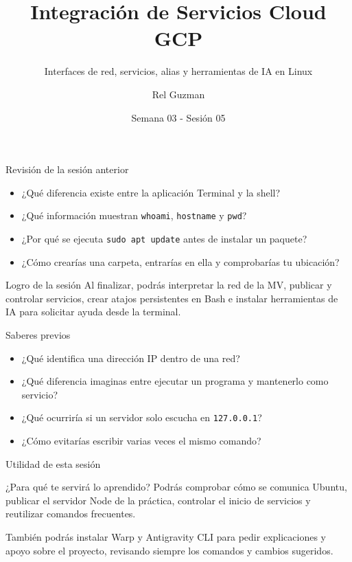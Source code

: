 \documentclass[aspectratio=169,10pt,c]{beamer}
\title{Integración de Servicios Cloud GCP}
\subtitle{Interfaces de red, servicios, alias y herramientas de IA en Linux}
\date{Semana 03 - Sesión 05}
\author{Rel Guzman}
\begin{document}
{\maketitle}

\begin{frame}{Revisión de la sesión anterior}
\begin{itemize}\setlength\itemsep{10pt}
  \item ¿Qué diferencia existe entre la aplicación Terminal y la shell?
  \item ¿Qué información muestran \texttt{whoami}, \texttt{hostname} y \texttt{pwd}?
  \item ¿Por qué se ejecuta \texttt{sudo apt update} antes de instalar un paquete?
  \item ¿Cómo crearías una carpeta, entrarías en ella y comprobarías tu ubicación?
\end{itemize}
\end{frame}

\begin{frame}[c]
\begin{block}{Logro de la sesión}
Al finalizar, podrás interpretar la red de la MV, publicar y controlar servicios, crear atajos persistentes en Bash e instalar herramientas de IA para solicitar ayuda desde la terminal.
\end{block}
\end{frame}

\begin{frame}{Saberes previos}
\begin{itemize}\setlength\itemsep{10pt}
  \item ¿Qué identifica una dirección IP dentro de una red?
  \item ¿Qué diferencia imaginas entre ejecutar un programa y mantenerlo como servicio?
  \item ¿Qué ocurriría si un servidor solo escucha en \texttt{127.0.0.1}?
  \item ¿Cómo evitarías escribir varias veces el mismo comando?
\end{itemize}
\end{frame}

\begin{frame}{Utilidad de esta sesión}
\begin{block}{¿Para qué te servirá lo aprendido?}
Podrás comprobar cómo se comunica Ubuntu, publicar el servidor Node de la práctica, controlar el inicio de servicios y reutilizar comandos frecuentes.
\end{block}
\vspace{0.2cm}
\small También podrás instalar Warp y Antigravity CLI para pedir explicaciones y apoyo sobre el proyecto, revisando siempre los comandos y cambios sugeridos.
\end{frame}
\end{document}
